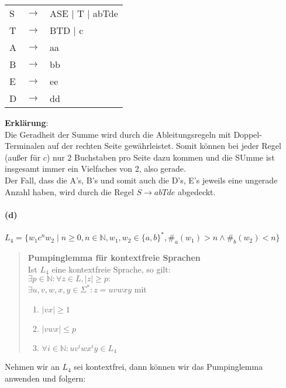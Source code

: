 	\begin{tabular}{lcl}
		S  & $\rightarrow$ & ASE $\mid$ T $\mid$ abTde \\
		T  & $\rightarrow$ & BTD $\mid$ c \\
		A & $\rightarrow$ & aa \\
		B & $\rightarrow$ & bb \\
		E  & $\rightarrow$ & ee \\
		D  & $\rightarrow$ & dd \\
	\end{tabular}
	
	\textbf{Erklärung}: \\
	Die Geradheit der Summe wird durch die Ableitungsregeln mit Doppel-Terminalen auf der rechten Seite gewährleistet. Somit können bei jeder Regel (außer für $c$) nur 2 Buchstaben pro Seite dazu kommen und die SUmme ist insgesamt immer ein Vielfaches von 2, also gerade.\\
	Der Fall, dass die A's, B's und somit auch die D's, E's jeweils eine ungerade Anzahl haben, wird durch die Regel $S \rightarrow abTde$ abgedeckt.
	\vspace{0.3cm}
	
\paragraph{(d)}
	$L_4 = \{w_1c^nw_2 \mid n \geq 0, n \in \mathbb{N}, w_1,w_2 \in \{a,b\}^*, \#_a(w_1)>n \land \#_b(w_2)<n\}$	

	\begin{quote}
	\textbf{Pumpinglemma für kontextfreie Sprachen} \\
	Ist $L_4$ eine kontextfreie Sprache, so gilt: \\
	$\exists p \in \mathbb{N}: \forall z \in L, |z| \geq p:$ \\
	$\exists u,v,w,x,y \in \Sigma^*: z = uvwxy$ mit
	\begin{enumerate}
		\item $|vx| \geq 1$
		\item $|vwx| \leq p$
		\item $\forall i \in \mathbb{N} : uv^{i}wx^{i}y \in L_4$
	\end{enumerate}
	\end{quote}

	Nehmen wir an $L_4$ sei kontextfrei, dann können wir das Pumpinglemma anwenden und folgern:
	
